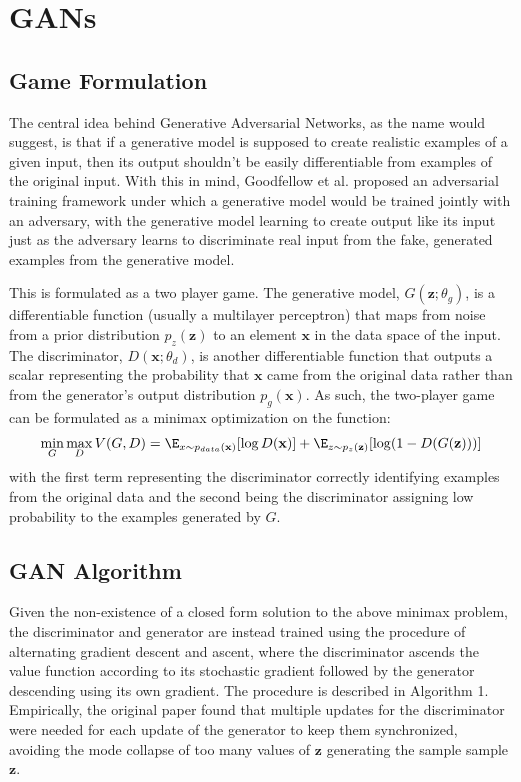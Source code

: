 \section{GANs}

\subsection{Game Formulation}
The central idea behind Generative Adversarial Networks, as the name would suggest, is that if a generative model is supposed to create realistic examples of a given input, then its output shouldn't be easily differentiable from examples of the original input. With this in mind, Goodfellow et al. \cite{goodfellow2014generative} proposed an adversarial training framework under which a generative model would be trained jointly with an adversary, with the generative model learning to create output like its input just as the adversary learns to discriminate real input from the fake, generated examples from the generative model.

This is formulated as a two player game. The generative model, $G(\mathbf{z}; \theta_g)$, is a differentiable function (usually a multilayer perceptron) that maps from noise from a prior distribution $p_z(\mathbf{z})$ to an element $\mathbf{x}$ in the data space of the input. The discriminator, $D(\mathbf{x};\theta_d)$, is another differentiable function that outputs a scalar representing the probability that $\mathbf{x}$ came from the original data rather than from the generator's output distribution $p_g(\mathbf{x})$. As such, the two-player game can be formulated as a minimax optimization on the function:
$$\min_G \max_D V(G,D) = \E_{x \sim p_{data}(\mathbf{x})}[\log{D(\mathbf{x})}] + \E_{z \sim p_{z}(\mathbf{z})} [\log(1 - D(G(\mathbf{z})))]$$
with the first term representing the discriminator correctly identifying examples from the original data and the second being the discriminator assigning low probability to the examples generated by $G$.

\subsection{GAN Algorithm}
Given the non-existence of a closed form solution to the above minimax problem, the discriminator and generator are instead trained using the procedure of alternating gradient descent and ascent, where the discriminator ascends the value function according to its stochastic gradient followed by the generator descending using its own gradient. The procedure is described in Algorithm 1. Empirically, the original paper found that multiple updates for the discriminator were needed for each update of the generator to keep them synchronized, avoiding the mode collapse of too many values of $\mathbf{z}$ generating the sample sample $\mathbf{z}$.


